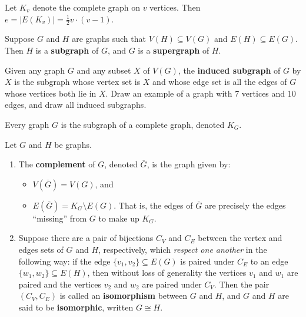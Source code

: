 \begin{theorem} \label{thm:edges_in_Kv} Let $K_v$ denote the complete graph on $v$ vertices.  Then $e=|E(K_v)|= \frac{1}{2} v \cdot (v-1)$.
\end{theorem}

\begin{definition}
    Suppose $G$ and $H$ are graphs such that $V(H) \subseteq V(G)$ and $E(H) \subseteq E(G)$.  Then $H$ is a \textbf{subgraph} of $G$, and $G$ is a \textbf{supergraph} of $H$.
\end{definition}

\begin{example} Given any graph $G$ and any subset $X$ of $V(G)$, the \textbf{induced subgraph} of $G$ by $X$ is the subgraph whose vertex set is $X$ and whose edge set is all the edges of $G$ whose vertices both lie in $X$.  Draw an example of a graph with 7 vertices and 10 edges, and draw all induced subgraphs.
\end{example}

\begin{lemma} Every graph $G$ is the subgraph of a complete graph, denoted $K_G$.
\end{lemma}

\begin{definition} Let $G$ and $H$ be graphs.
    \begin{enumerate}
    \item The \textbf{complement} of $G$, denoted $\overline{G}$, is the graph given by:
    \begin{itemize}
        \item $V(\overline{G}) = V(G)$, and
        \item $E(\overline{G}) = K_G \setminus E(G)$.  That is, the edges of $\overline{G}$ are precisely the edges ``missing'' from $G$ to make up $K_G$.
    \end{itemize}

    \item Suppose there are a pair of bijections $C_V$ and $C_E$ between the vertex and edges sets of $G$ and $H$, respectively, which \textit{respect one another} in the following way: if the edge $\{v_1, v_2\}\subseteq E(G)$ is paired under $C_E$ to an edge $\{w_1, w_2\}\subseteq E(H)$, then without loss of generality the vertices $v_1$ and $w_1$ are paired and the vertices $v_2$ and $w_2$ are paired under $C_V$.  Then the pair $(C_V, C_E)$ is called an \textbf{isomorphism} between $G$ and $H$, and $G$ and $H$ are said to be \textbf{isomorphic}, written $G \cong H$.
\end{enumerate}
\end{definition}

